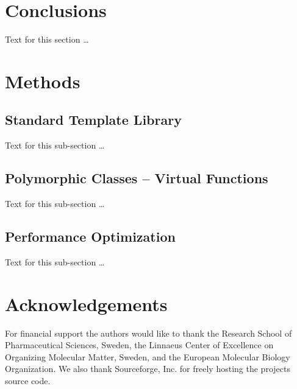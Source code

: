 \documentclass[10pt]{bmc_article}
\newenvironment{bmcformat}{\fussy\setboolean{publ}{true}}{\fussy}
\begin{document}
\begin{bmcformat}
    

\section*{Conclusions}
  Text for this section \ldots


  
\section*{Methods}
  \subsection*{Standard Template Library}
    Text for this sub-section \ldots

  \subsection*{Polymorphic Classes -- Virtual Functions}
    Text for this sub-section \ldots

  \subsection*{Performance Optimization}
    Text for this sub-section \ldots


    

    

\section*{Acknowledgements}
  For financial support the authors would like to thank the Research School of Pharmaceutical Sciences, Sweden, the Linnaeus Center of Excellence on Organizing Molecular Matter, Sweden,
and the European Molecular Biology Organization. We also thank Sourceforge, Inc. for freely hosting the projects source code.

 



\end{bmcformat}
\end{document}
